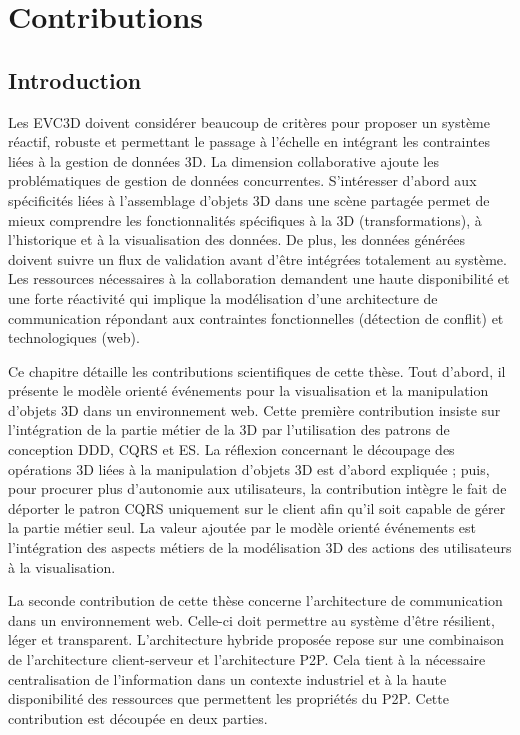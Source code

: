 \chapter{Contributions}
\chaptertable
\section{Introduction}
Les \gls{EVC3D} doivent considérer beaucoup de critères pour proposer un 
système réactif, robuste et permettant le passage à l'échelle en intégrant les 
contraintes liées à la gestion de données \gls{3D}. La dimension collaborative 
ajoute les problématiques de gestion de données concurrentes.
S'intéresser d'abord aux spécificités liées à l'assemblage d'objets \gls{3D} dans 
une scène partagée permet de mieux comprendre les fonctionnalités spécifiques à 
la \gls{3D} (transformations), à l'historique et à la visualisation des données. 
De plus, les données générées doivent suivre un flux de validation avant d'être 
intégrées totalement au système.
Les ressources nécessaires à la collaboration demandent une haute disponibilité 
et une forte réactivité qui implique la modélisation d'une architecture 
de communication répondant aux contraintes fonctionnelles (détection de conflit) 
et technologiques (web).

Ce chapitre détaille les contributions scientifiques de cette thèse.
Tout d'abord, il présente le modèle orienté événements pour la visualisation et la 
manipulation d'objets \gls{3D} dans un environnement web. 
Cette première contribution insiste sur l'intégration de la partie métier de la 
\gls{3D} par l'utilisation des patrons de conception \gls{DDD}, \gls{CQRS} et 
\gls{ES}. 
La réflexion concernant le découpage des opérations \gls{3D} liées à la 
manipulation d'objets \gls{3D} est d'abord expliquée ; puis, pour procurer plus 
d'autonomie aux utilisateurs, la contribution intègre le fait de déporter le patron 
\gls{CQRS} uniquement sur le client afin qu'il soit capable de gérer la partie métier 
seul. La valeur ajoutée par le modèle orienté événements est l'intégration des 
aspects métiers de la modélisation 3D des actions des utilisateurs à la 
visualisation. 

La seconde contribution de cette thèse concerne l'architecture de 
communication dans un environnement web. Celle-ci doit permettre au système 
d'être résilient, léger et transparent. 
L'architecture hybride proposée repose sur une combinaison de l'architecture 
client-serveur et l'architecture \gls{P2P}. 
Cela tient à la nécessaire centralisation de l'information dans un contexte industriel 
et à la haute disponibilité des ressources que permettent les propriétés du 
\gls{P2P}. Cette contribution est découpée en deux parties. 

